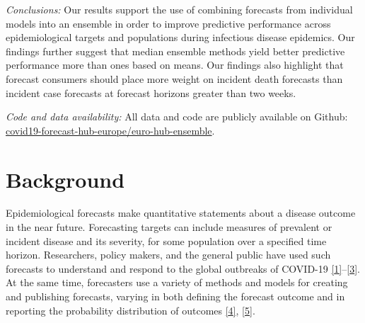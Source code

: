 \documentclass[
]{article}
\begin{document}
\emph{Conclusions:} Our results support the use of combining forecasts from individual models into an ensemble in order to improve predictive performance across epidemiological targets and populations during infectious disease epidemics. Our findings further suggest that median ensemble methods yield better predictive performance more than ones based on means. Our findings also highlight that forecast consumers should place more weight on incident death forecasts than incident case forecasts at forecast horizons greater than two weeks.

\emph{Code and data availability:} All data and code are publicly available on Github: \href{https://github.com/covid19-forecast-hub-europe/euro-hub-ensemble}{covid19-forecast-hub-europe/euro-hub-ensemble}.

\hypertarget{background}{%
\section{Background}\label{background}}

Epidemiological forecasts make quantitative statements about a disease outcome in the near future. Forecasting targets can include measures of prevalent or incident disease and its severity, for some population over a specified time horizon. Researchers, policy makers, and the general public have used such forecasts to understand and respond to the global outbreaks of COVID-19 \protect\hyperlink{ref-basshuysenThreeWaysWhich2021}{{[}1{]}}--\protect\hyperlink{ref-europeancentrefordiseasepreventionandcontrolForecastingCOVID19Cases2021}{{[}3{]}}. At the same time, forecasters use a variety of methods and models for creating and publishing forecasts, varying in both defining the forecast outcome and in reporting the probability distribution of outcomes \protect\hyperlink{ref-zelnerAccountingUncertaintyPandemic2021}{{[}4{]}}, \protect\hyperlink{ref-jamesUseMisuseMathematical2021}{{[}5{]}}.
\end{document}

